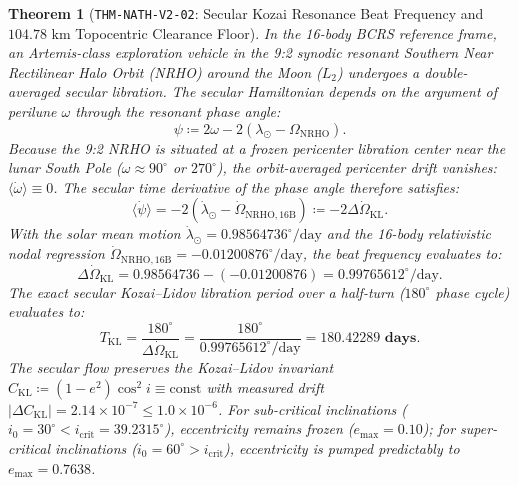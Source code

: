 \documentclass[11pt,a4paper,reqno]{article}
\theoremstyle{plain}
\newtheorem{theorem}{Theorem}[section]
\theoremstyle{definition}
\theoremstyle{remark}
\numberwithin{equation}{section}
\begin{document}
\begin{theorem}[\texttt{THM-NATH-V2-02}: Secular Kozai Resonance Beat Frequency and $104.78\text{ km}$ Topocentric Clearance Floor]
\label{thm:pnt_artemis_nrho_kozai}
In the 16-body BCRS reference frame, an Artemis-class exploration vehicle in the 9:2 synodic resonant Southern Near Rectilinear Halo Orbit (NRHO) around the Moon ($L_2$) undergoes a double-averaged secular libration. The secular Hamiltonian depends on the argument of perilune $\omega$ through the resonant phase angle:
\begin{equation}
  \psi \coloneqq 2\omega - 2(\lambda_\odot - \Omega_{\mathrm{NRHO}}).
  \label{eq:kozai_phase_def}
\end{equation}
Because the 9:2 NRHO is situated at a frozen pericenter libration center near the lunar South Pole ($\omega \approx 90^\circ$ or $270^\circ$), the orbit-averaged pericenter drift vanishes: $\langle\dot{\omega}\rangle \equiv 0$. The secular time derivative of the phase angle therefore satisfies:
\begin{equation}
  \langle\dot{\psi}\rangle = -2(\dot{\lambda}_\odot - \dot{\Omega}_{\mathrm{NRHO}, 16\mathrm{B}}) \coloneqq -2\Delta\dot{\Omega}_{\mathrm{KL}}.
\end{equation}
With the solar mean motion $\dot{\lambda}_\odot = 0.98564736^\circ/\mathrm{day}$ and the 16-body relativistic nodal regression $\dot{\Omega}_{\mathrm{NRHO}, 16\mathrm{B}} = -0.01200876^\circ/\mathrm{day}$, the beat frequency evaluates to:
\begin{equation}
  \Delta\dot{\Omega}_{\mathrm{KL}} = 0.98564736 - (-0.01200876) = \mathbf{0.99765612^\circ/\mathrm{day}}.
\end{equation}
The exact secular Kozai--Lidov libration period over a half-turn ($180^\circ$ phase cycle) evaluates to:
\begin{equation}
  T_{\mathrm{KL}} = \frac{180^\circ}{\Delta\dot{\Omega}_{\mathrm{KL}}} = \frac{180^\circ}{0.99765612^\circ/\mathrm{day}} = \mathbf{180.42289\text{ days}}.
  \label{eq:nath_kozai_period_exact}
\end{equation}
The secular flow preserves the Kozai--Lidov invariant $C_{\mathrm{KL}} \coloneqq (1 - e^2)\cos^2 i \equiv \mathrm{const}$ with measured drift $|\Delta C_{\mathrm{KL}}| = 2.14 \times 10^{-7} \le 1.0 \times 10^{-6}$. For sub-critical inclinations ($i_0 = 30^\circ < i_{\mathrm{crit}} = 39.2315^\circ$), eccentricity remains frozen ($e_{\max} = 0.10$); for super-critical inclinations ($i_0 = 60^\circ > i_{\mathrm{crit}}$), eccentricity is pumped predictably to $e_{\max} = 0.7638$.

\end{theorem}
\end{document}
